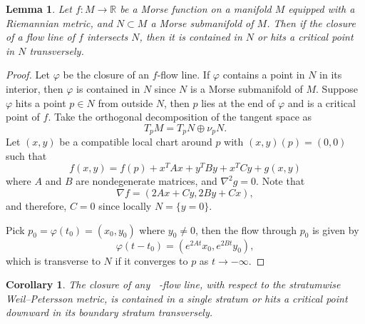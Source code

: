 \documentclass[12pt]{amsart}
\newtheorem{lemma}[theorem]{Lemma}
\newtheorem{corollary}[theorem]{Corollary}
\theoremstyle{remark}
\theoremstyle{definition}
\DeclareMathOperator{\syst}{sys_T}
\numberwithin{equation}{section}
\begin{document}
\begin{lemma}
    Let $f\colon M\to\mathbb R$ be a Morse function on a manifold $M$ equipped with a Riemannian metric, and $N\subset M$ a Morse submanifold of $M$. Then if the closure of a flow line of $f$ intersects $N$, then it is contained in $N$ or hits a critical point in $N$ transversely.
\end{lemma}

\begin{proof}
    Let $\varphi$ be the closure of an $f$-flow line. If $\varphi$ contains a point in $N$ in its interior, then $\varphi$ is contained in $N$ since $N$ is a Morse submanifold of $M$. Suppose $\varphi$ hits a point $p\in N$ from outside $N$, then $p$ lies at the end of $\varphi$ and is a critical point of $f$. Take the orthogonal decomposition of the tangent space as
    \[
    T_pM=T_pN\oplus \nu_pN.
    \]
    Let $(x,y)$ be a compatible local chart around $p$ with $(x,y)(p)=(0,0)$ such that
    \[
    f(x,y)=f(p)+x^TAx+y^TBy+x^TCy+g(x,y)
    \]
    where $A$ and $B$ are nondegenerate matrices, and $\nabla^2 g=0$. Note that
    \[
    \nabla f=(2Ax+Cy,2By+Cx),
    \]
    and therefore, $C=0$ since locally $N=\{y=0\}$.

    Pick $p_0=\varphi(t_0)=(x_0,y_0)$ where $y_0\neq0$, then the flow through $p_0$ is given by
    \[
    \varphi(t-t_0)=(e^{2At}x_0,e^{2Bt}y_0),
    \]
    which is transverse to $N$ if it converges to $p$ as $t\to-\infty$.
\end{proof}

\begin{corollary}
\label{transverse to submanifold}
    The closure of any $\syst$-flow line, with respect to the stratumwise Weil--Petersson metric, is contained in a single stratum or hits a critical point downward in its boundary stratum transversely.
\end{corollary}




    
    
    
\end{document}
